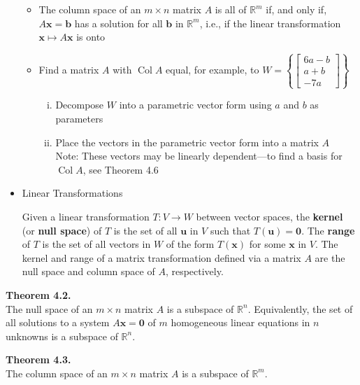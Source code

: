 \documentclass[10pt]{book}
\newenvironment{boxthm}{\begin{mdframed}[backgroundcolor=gray!30,nobreak=true]}{\end{mdframed}}
\newenvironment{boxdef}{\begin{mdframed}[backgroundcolor=gray!30,linewidth=0pt,nobreak=true]}{\end{mdframed}}
\newcommand{\R}{\mathbb{R}}
\newcommand{\vect}[1]{\ensuremath{\boldsymbol{\mathbf{#1}}}}
\DeclareMathOperator{\Col}{Col}
\newcommand{\Axb}{A\vect{x}=\vect{b}}
\newcommand{\Axz}{A\vect{x}=\vect{0}}
\begin{document}
\begin{itemize}
\begin{itemize}
			\item The column space of an $m\times n$ matrix $A$ is all of $\R^m$ if, and only if, $\Axb$ has a solution for all $\vect{b}$ in $\R^m$, i.e., if the linear transformation $\vect{x}\mapsto A\vect{x}$ is onto
			\item Find a matrix $A$ with $\Col A$ equal, for example, to $W=\left\{\begin{bmatrix}6a-b\\a+b\\-7a\end{bmatrix}\right\}$
				\begin{enumerate}[(i)]
					\item Decompose $W$ into a parametric vector form using $a$ and $b$ as parameters
					\item Place the vectors in the parametric vector form into a matrix $A$ \\
					Note: These vectors may be linearly dependent---to find a basis for $\Col A$, see Theorem 4.6
				\end{enumerate}
		\end{itemize}
	\item Linear Transformations
	\begin{boxdef}
		Given a linear transformation $T:V\rightarrow W$ between vector spaces, the \textbf{kernel} (or \textbf{null space}) of $T$ is the set of all $\vect{u}$ in $V$ such that $T(\vect{u})=\vect{0}$. The \textbf{range} of $T$ is the set of all vectors in $W$ of the form $T(\vect{x})$ for some $\vect{x}$ in $V$. The kernel and range of a matrix transformation defined via a matrix $A$ are the null space and column space of $A$, respectively.
	\end{boxdef}
\end{itemize}

\begin{boxthm}
	\textbf{Theorem 4.2.} \\
	The null space of an $m\times n$ matrix $A$ is a subspace of $\R^n$. Equivalently, the set of all solutions to a system $\Axz$ of $m$ homogeneous linear equations in $n$ unknowns is a subspace of $\R^n$.
\end{boxthm}
\begin{boxthm}
	\textbf{Theorem 4.3.} \\
	The column space of an $m\times n$ matrix $A$ is a subspace of $\R^m$.
\end{boxthm}


\newpage


\end{document}
